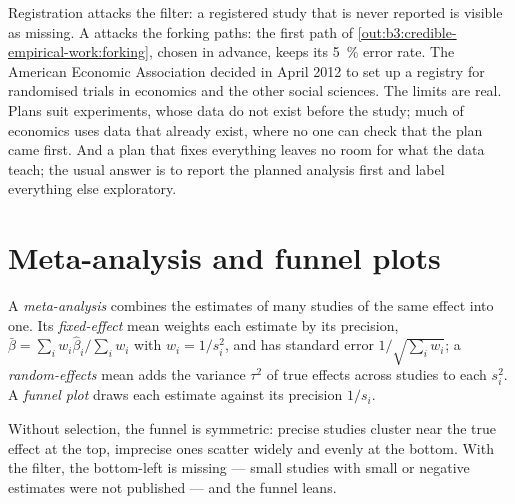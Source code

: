 Registration attacks the filter: a registered study that is never reported is
visible as missing. A  attacks the forking paths: the first
path of \cref{out:b3:credible-empirical-work:forking}, chosen in advance, keeps
its 5~\% error rate. The American Economic Association decided in April 2012
to set up a registry for randomised trials in economics and the other social
sciences. %
The limits are real. Plans suit experiments, whose data do not exist before
the study; much of economics uses data that already exist, where no one can
check that the plan came first. And a plan that fixes everything leaves no room
for what the data teach; the usual answer is to report the planned analysis
first and label everything else exploratory.

\section{Meta-analysis and funnel plots}\label{sec:b3:credible-empirical-work:meta}

\begin{definition}\label{def:b3:credible-empirical-work:meta-analysis}
A \emph{meta-analysis} combines the estimates of many studies of the same effect
into one. Its \emph{fixed-effect} mean weights each estimate by its precision,
$\bar\beta = \sum_i w_i\hat\beta_i / \sum_i w_i$ with $w_i = 1/s_i^2$, and has
standard error $1/\sqrt{\sum_i w_i}$; a \emph{random-effects} mean adds the
variance $\tau^2$ of true effects across studies to each $s_i^2$. A \emph{funnel
plot} draws each estimate against its precision $1/s_i$.
\end{definition}

Without selection, the funnel is symmetric: precise studies cluster near the
true effect at the top, imprecise ones scatter widely and evenly at the bottom.
With the filter, the bottom-left is missing --- small studies with small or
negative estimates were not published --- and the funnel leans.


